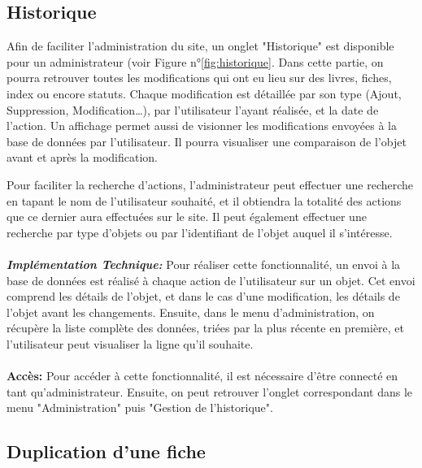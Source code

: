\documentclass[12pt]{article}
\begin{document}
    \subsection{Historique}

    Afin de faciliter l'administration du site, un onglet "Historique" est disponible pour un administrateur (voir Figure n°\ref{fig:historique}.
    Dans cette partie, on pourra retrouver toutes les modifications qui ont eu lieu sur des livres, fiches, index ou encore statuts.
    Chaque modification est détaillée par son type (Ajout, Suppression, Modification\ldots), par l'utilisateur l'ayant réalisée, et la date de l'action.
    Un affichage permet aussi de visionner les modifications envoyées à la base de données par l'utilisateur. Il pourra visualiser une comparaison de l'objet avant et après la modification.

    Pour faciliter la recherche d'actions, l'administrateur peut effectuer une recherche en tapant le nom de l'utilisateur souhaité, et il obtiendra la totalité des actions que ce dernier aura effectuées sur le site.
    Il peut également effectuer une recherche par type d'objets ou par l'identifiant de l'objet auquel il s'intéresse.
    \\
    \\
    \textit{\textbf{Implémentation Technique:}}
    Pour réaliser cette fonctionnalité, un envoi à la base de données est réalisé à chaque action de l'utilisateur sur un objet. Cet envoi comprend les détails de l'objet, et dans le cas d'une modification, les détails de l'objet avant les changements.
    Ensuite, dans le menu d'administration, on récupère la liste complète des données, triées par la plus récente en première, et l'utilisateur peut visualiser la ligne qu'il souhaite.
    \\
    \\
    \textbf{Accès: }
    Pour accéder à cette fonctionnalité, il est nécessaire d'être connecté en tant qu'administrateur. Ensuite, on peut retrouver l'onglet correspondant dans le menu "Administration" puis "Gestion de l'historique".

    \subsection{Duplication d'une fiche}
\end{document}
